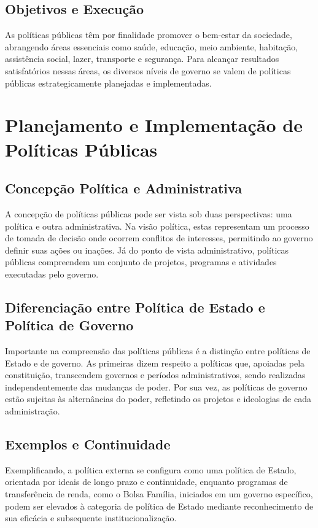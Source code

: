 \documentclass[
   article,       
   12pt,          
   oneside,       
   a4paper,       
   english,       
   brazil,        
   sumario=tradicional
   ]{abntex2}
\begin{document}
\subsection{Objetivos e Execução}
As políticas públicas têm por finalidade promover o bem-estar da sociedade, abrangendo áreas essenciais como saúde, educação, meio ambiente, habitação, assistência social, lazer, transporte e segurança. Para alcançar resultados satisfatórios nessas áreas, os diversos níveis de governo se valem de políticas públicas estrategicamente planejadas e implementadas.

\section{Planejamento e Implementação de Políticas Públicas}
\subsection{Concepção Política e Administrativa}
A concepção de políticas públicas pode ser vista sob duas perspectivas: uma política e outra administrativa. Na visão política, estas representam um processo de tomada de decisão onde ocorrem conflitos de interesses, permitindo ao governo definir suas ações ou inações. Já do ponto de vista administrativo, políticas públicas compreendem um conjunto de projetos, programas e atividades executadas pelo governo.

\subsection{Diferenciação entre Política de Estado e Política de Governo}
Importante na compreensão das políticas públicas é a distinção entre políticas de Estado e de governo. As primeiras dizem respeito a políticas que, apoiadas pela constituição, transcendem governos e períodos administrativos, sendo realizadas independentemente das mudanças de poder. Por sua vez, as políticas de governo estão sujeitas às alternâncias do poder, refletindo os projetos e ideologias de cada administração.

\subsection{Exemplos e Continuidade}
Exemplificando, a política externa se configura como uma política de Estado, orientada por ideais de longo prazo e continuidade, enquanto programas de transferência de renda, como o Bolsa Família, iniciados em um governo específico, podem ser elevados à categoria de política de Estado mediante reconhecimento de sua eficácia e subsequente institucionalização.
\end{document}
